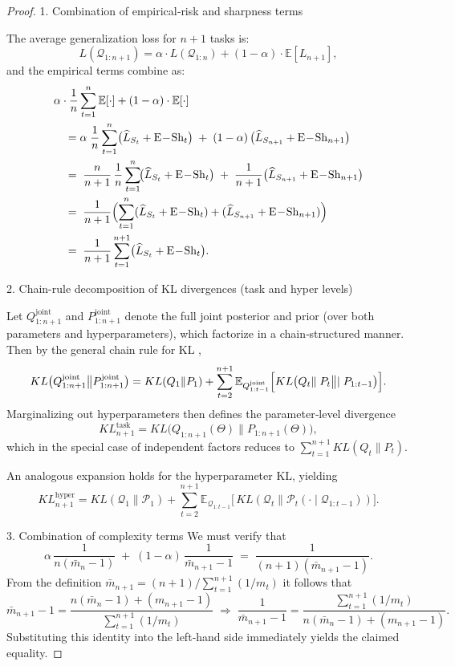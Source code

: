 \documentclass[letterpaper]{article} %
\begin{document}
\begin{proof}
1. Combination of empirical‐risk and sharpness terms 

The average generalization loss for $n+1$ tasks is:
\[
L(\mathcal{Q}_{1:n+1}) = \alpha \cdot L(\mathcal{Q}_{1:n}) + (1-\alpha) \cdot \mathbb{E}\left[L_{n+1}\right],
\]
and the empirical terms combine as:
\begin{align*}
&\alpha \cdot \frac{1}{n}\sum_{t=1}^n \mathbb{E}[\cdot] + (1-\alpha) \cdot \mathbb{E}[\cdot] \\
&\quad=\alpha\;\frac{1}{n}\sum_{t=1}^n\bigl(\widehat L_{S_t}+\mathrm{E\!-\!Sh}_t\bigr)
\;+\;(1-\alpha)\,\bigl(\widehat L_{S_{n+1}}+\mathrm{E\!-\!Sh}_{n+1}\bigr)\\
&\quad=\;\frac{n}{n+1}\,\frac{1}{n}\sum_{t=1}^n\!\bigl(\widehat L_{S_t}+\mathrm{E\!-\!Sh}_t\bigr)
\;+\;\frac{1}{n+1}\bigl(\widehat L_{S_{n+1}}+\mathrm{E\!-\!Sh}_{n+1}\bigr)\\
&\quad=\;\frac{1}{n+1}\Bigl(\sum_{t=1}^n(\widehat L_{S_t}+\mathrm{E\!-\!Sh}_t)
+(\widehat L_{S_{n+1}}+\mathrm{E\!-\!Sh}_{n+1})\Bigr)\\
&\quad=\;\frac{1}{n+1}\sum_{t=1}^{n+1}\bigl(\widehat L_{S_t}+\mathrm{E\!-\!Sh}_t\bigr).
\end{align*}

2. Chain-rule decomposition of KL divergences (task and hyper levels)  


Let \(Q^{\mathrm{joint}}_{1:n+1}\) and \(P^{\mathrm{joint}}_{1:n+1}\) denote the full joint posterior and prior (over both parameters and hyperparameters), which factorize in a chain‐structured manner.  Then by the general chain rule for KL ,
\[
KL\bigl(Q^{\mathrm{joint}}_{1:n+1}\big\|P^{\mathrm{joint}}_{1:n+1}\bigr)
=KL(Q_1\|P_1)
+\sum_{t=2}^{n+1}
\mathbb{E}_{Q^{\mathrm{joint}}_{1:t-1}}
\Bigl[
  KL\bigl(Q_t\|\;P_t\bigl\|\mid P_{1:t-1}\bigr)
\Bigr].
\]
Marginalizing out hyperparameters then defines the parameter‐level divergence
\[
KL^{\mathrm{task}}_{n+1}
=KL\bigl(Q_{1:n+1}(\Theta)\big\|P_{1:n+1}(\Theta)\bigr),
\]
which in the special case of independent factors reduces to \(\sum_{t=1}^{n+1}KL(Q_t\|P_t)\).

An analogous expansion holds for the hyperparameter KL, yielding
\[
KL^{\mathrm{hyper}}_{n+1}
=KL(\mathcal Q_1\|\mathcal P_1)
+\sum_{t=2}^{n+1}
\mathbb{E}_{\mathcal Q_{1:t-1}}
\bigl[\,KL(\mathcal Q_t\|\mathcal P_t(\cdot\mid\mathcal Q_{1:t-1}))\bigr].
\]

3. Combination of complexity terms  
We must verify that
\[
\alpha\,\frac{1}{n(\bar m_n-1)}
\;+\;
(1-\alpha)\,\frac{1}{\bar m_{n+1}-1}
\;=\;\frac{1}{(n+1)(\bar m_{n+1}-1)}.
\]
From the definition
\(\bar m_{n+1}=(n+1)/\sum_{t=1}^{n+1}(1/m_t)\)
it follows that
\[
\bar m_{n+1}-1
=\frac{n(\bar m_n-1)+(m_{n+1}-1)}{\sum_{t=1}^{n+1}(1/m_t)}
\;\Longrightarrow\;
\frac{1}{\bar m_{n+1}-1}
=\frac{\sum_{t=1}^{n+1}(1/m_t)}{n(\bar m_n-1)+(m_{n+1}-1)}.
\]
Substituting this identity into the left‐hand side immediately yields the claimed equality.




\end{proof}
\end{document}
